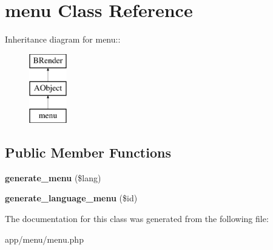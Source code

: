 \section{menu Class Reference}
\label{classmenu}
Inheritance diagram for menu::\begin{figure}[H]
\begin{center}
\leavevmode
\includegraphics[height=3cm]{classmenu}
\end{center}
\end{figure}
\subsection*{Public Member Functions}
\begin{DoxyCompactItemize}
\item 
{\bfseries generate\_\-menu} (\$lang)\label{classmenu_a00992e58943171e1d5f20b592620ea66}

\item 
{\bfseries generate\_\-language\_\-menu} (\$id)\label{classmenu_a67dddb989d851a6484ea7a03e9ad473e}

\end{DoxyCompactItemize}


The documentation for this class was generated from the following file:\begin{DoxyCompactItemize}
\item 
app/menu/menu.php\end{DoxyCompactItemize}
